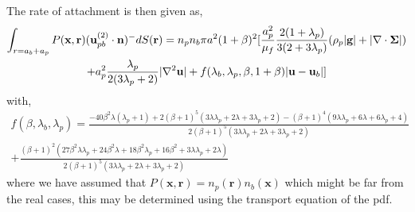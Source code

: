 The rate of attachment is then given as, 
\begin{multline*} 
    \int_{r=a_b+a_p } 
    P(\textbf{x},\textbf{r}) (\textbf{u}_{pb}^{(2)}\cdot \textbf{n})^- dS(\textbf{r})
    =
    n_pn_b \pi a^2(1+\beta)^2 [
        \frac{a_p^2}{\mu_f}
        \frac{2(1+\lambda_p)}{3(2+3\lambda_p)}( \rho_p|\textbf{g}|+ |\mathbf{\nabla}\cdot\bm\Sigma|)\\
        + a_p^2 \frac{\lambda_p}{2(3\lambda_p +2)} |\mathbf{\nabla}^2 \textbf{u}|
        + f(\lambda_b,\lambda_p,\beta,1+\beta)  |\textbf{u} - \textbf{u}_b|
    ]
\end{multline*}
with, 
\begin{multline}
    f(\beta, \lambda_b, \lambda_p)
    =
    \frac{- 40 \beta^{2} \lambda \left(\lambda_{p} + 1\right) + 2 \left(\beta + 1\right)^{5} \left(3 \lambda \lambda_{p} + 2 \lambda + 3 \lambda_{p} + 2\right) - \left(\beta + 1\right)^{4} \left(9 \lambda \lambda_{p} + 6 \lambda + 6 \lambda_{p} + 4\right) }{2 \left(\beta + 1\right)^{5} \left(3 \lambda \lambda_{p} + 2 \lambda + 3 \lambda_{p} + 2\right)}\\
    + \frac{ \left(\beta + 1\right)^{2} \left(27 \beta^{2} \lambda \lambda_{p} + 24 \beta^{2} \lambda + 18 \beta^{2} \lambda_{p} + 16 \beta^{2} + 3 \lambda \lambda_{p} + 2 \lambda\right)}{2 \left(\beta + 1\right)^{5} \left(3 \lambda \lambda_{p} + 2 \lambda + 3 \lambda_{p} + 2\right)}
\end{multline}
where we have assumed that $P(\textbf{x},\textbf{r}) = n_p(\textbf{r})n_b(\textbf{x})$ which might be far from the real cases, this may be determined using the transport equation of the pdf. 
